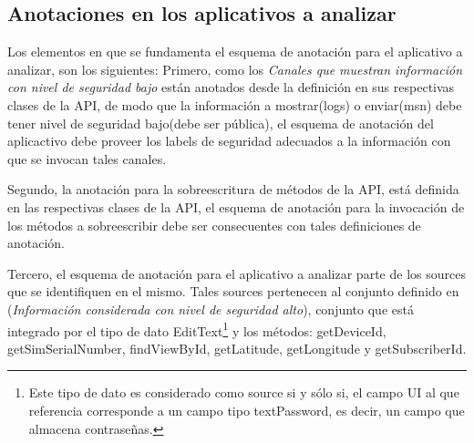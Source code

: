 \subsection{Anotaciones en los aplicativos a analizar}
\label{subsec:apps}
Los elementos en que se fundamenta el esquema de anotación para el aplicativo a
analizar, son los siguientes:\newline 
Primero, como los \textit{Canales que muestran información con nivel de
seguridad bajo} están anotados desde la definición en sus respectivas clases de
la API, de modo que la información a mostrar(logs) o enviar(msn) debe tener
nivel de seguridad bajo(debe ser pública), el esquema de anotación del
aplicactivo debe proveer los labels de seguridad adecuados a la información con
que se invocan tales canales.

Segundo, la anotación para la sobreescritura de métodos de la API, está definida
en las respectivas clases de la API, el esquema de anotación para la invocación
de los métodos a sobreescribir debe ser consecuentes con tales definiciones de
anotación.

Tercero, el esquema de anotación para el aplicativo a analizar parte de
los sources que se identifiquen en el mismo. Tales sources pertenecen al conjunto
definido en (\textit{Información considerada con nivel de seguridad alto}),
conjunto que está integrado por el tipo de dato EditText\footnote{Este tipo de
dato es considerado como source si y sólo si, el campo UI al que referencia
corresponde a un campo tipo textPassword, es decir, un campo que almacena
contraseñas.} y los métodos: getDeviceId, getSimSerialNumber, findViewById,
getLatitude, getLongitude y getSubscriberId.

